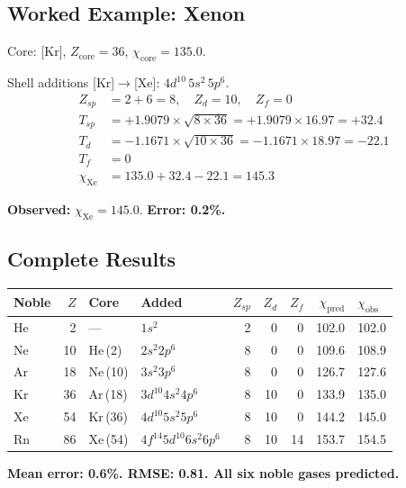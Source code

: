\subsection{Worked Example: Xenon}

Core: [Kr], $Z_{\text{core}} = 36$, $\chi_{\text{core}} = 135.0$.

Shell additions [Kr]$\to$[Xe]: $4d^{10}\,5s^2\,5p^6$.
\begin{align}
  Z_{sp} &= 2 + 6 = 8, \quad Z_d = 10, \quad Z_f = 0 \\
  T_{sp} &= +1.9079 \times \sqrt{8 \times 36} = +1.9079 \times 16.97 = +32.4 \\
  T_d    &= -1.1671 \times \sqrt{10 \times 36} = -1.1671 \times 18.97 = -22.1 \\
  T_f    &= 0 \\
  \chi_{\text{Xe}} &= 135.0 + 32.4 - 22.1 = 145.3
\end{align}

\textbf{Observed:} $\chi_{\text{Xe}} = 145.0$.  \textbf{Error: 0.2\%.}

\subsection{Complete Results}

\begin{center}
\begin{tabular}{lrllrrrrl}
\hline
\textbf{Noble} & $Z$ & \textbf{Core} & \textbf{Added} & $Z_{sp}$ & $Z_d$ & $Z_f$ & $\chi_{\text{pred}}$ & $\chi_{\text{obs}}$ \\
\hline
He &  2 & ---      & $1s^2$                  &  2 &  0 &  0 & 102.0 & 102.0 \\
Ne & 10 & He\,(2)  & $2s^2 2p^6$             &  8 &  0 &  0 & 109.6 & 108.9 \\
Ar & 18 & Ne\,(10) & $3s^2 3p^6$             &  8 &  0 &  0 & 126.7 & 127.6 \\
Kr & 36 & Ar\,(18) & $3d^{10} 4s^2 4p^6$     &  8 & 10 &  0 & 133.9 & 135.0 \\
Xe & 54 & Kr\,(36) & $4d^{10} 5s^2 5p^6$     &  8 & 10 &  0 & 144.2 & 145.0 \\
Rn & 86 & Xe\,(54) & $4f^{14} 5d^{10} 6s^2 6p^6$ &  8 & 10 & 14 & 153.7 & 154.5 \\
\hline
\end{tabular}
\end{center}

\begin{center}
\textbf{Mean error: 0.6\%.  \quad RMSE: 0.81.  \quad All six noble gases predicted.}
\end{center}


